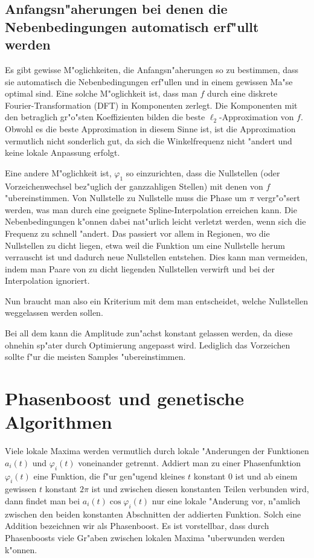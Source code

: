 \documentclass[a4paper]{scrartcl}
\newcommand{\pphi}{{\varphi}}
\begin{document}
\subsection{Anfangsn"aherungen bei denen die Nebenbedingungen automatisch erf"ullt werden}

Es gibt gewisse M"oglichkeiten, die Anfangsn"aherungen so zu bestimmen, dass sie automatisch die Nebenbedingungen erf"ullen und in einem gewissen Ma"se optimal sind. 
Eine solche M"oglichkeit ist, dass man $f$ durch eine diskrete Fourier-Transformation (DFT) in Komponenten zerlegt. 
Die Komponenten mit den betraglich gr"o"sten Koeffizienten bilden die beste $\ell_2$-Approximation von $f$. 
Obwohl es die beste Approximation in diesem Sinne ist, ist die Approximation vermutlich nicht sonderlich gut, da sich die Winkelfrequenz nicht "andert und keine lokale Anpassung erfolgt. 

Eine andere M"oglichkeit ist, $\pphi_1$ so einzurichten, dass die Nullstellen (oder Vorzeichenwechsel bez"uglich der ganzzahligen Stellen) mit denen von $f$ "ubereinstimmen. 
Von Nullstelle zu Nullstelle muss die Phase um $\pi$ vergr"o"sert werden, was man durch eine geeignete Spline-Interpolation erreichen kann. 
Die Nebenbedingungen k"onnen dabei nat"urlich leicht verletzt werden, wenn sich die Frequenz zu schnell "andert. 
Das passiert vor allem in Regionen, wo die Nullstellen zu dicht liegen, etwa weil die Funktion um eine Nullstelle herum verrauscht ist und dadurch neue Nullstellen entstehen. 
Dies kann man vermeiden, indem man Paare von zu dicht liegenden Nullstellen verwirft und bei der Interpolation ignoriert. 

Nun braucht man also ein Kriterium mit dem man entscheidet, welche Nullstellen weggelassen werden sollen. 

Bei all dem kann die Amplitude zun"achst konstant gelassen werden, da diese ohnehin sp"ater durch Optimierung angepasst wird. 
Lediglich das Vorzeichen sollte f"ur die meisten Samples "ubereinstimmen. 


\section{Phasenboost und genetische Algorithmen} \label{sec:jumps}

Viele lokale Maxima werden vermutlich durch lokale "Anderungen der Funktionen $a_i(t)$ und $\pphi_i(t)$ voneinander getrennt. 
Addiert man zu einer Phasenfunktion $\pphi_i(t)$ eine Funktion, die f"ur gen"ugend kleines $t$ konstant $0$ ist und ab einem gewissen $t$ konstant $2\pi$ ist und zwischen diesen konstanten Teilen verbunden wird, dann findet man bei $a_i(t)\cos\pphi_i(t)$ nur eine lokale "Anderung vor, n"amlich zwischen den beiden konstanten Abschnitten der addierten Funktion. 
Solch eine Addition bezeichnen wir als Phasenboost. 
Es ist vorstellbar, dass durch Phasenboosts viele Gr"aben zwischen lokalen Maxima "uberwunden werden k"onnen. 
\end{document}
